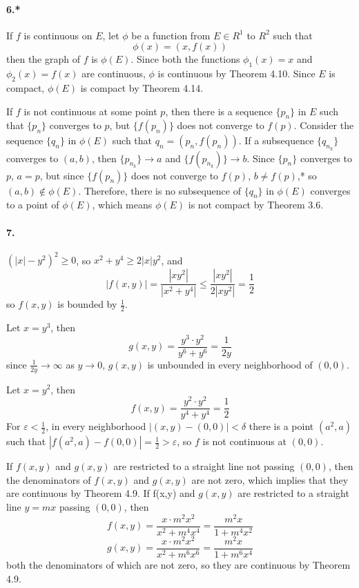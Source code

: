 \documentclass[a4paper]{article}
\begin{document}
\paragraph{6.*}
If $f$ is continuous on $E$, let $\phi$ be a function from $E\in R^1$ to $R^2$ such that 
\[
\phi(x)=(x,f(x))
\]
then the graph of $f$ is $\phi(E)$. Since both the functions  $\phi_1(x)=x$ and $\phi_2(x)=f(x)$ are continuous, $\phi$ is continuous by Theorem 4.10. Since $E$ is compact, $\phi(E)$ is compact by Theorem 4.14.
\smallskip

If $f$ is not continuous at some point $p$, then there is a sequence $\{p_n\}$ in $E$ such that $\{p_n\}$ converges to $p$, but $\{f(p_n)\}$ does not converge to $f(p)$. Consider the sequence $\{q_n\}$ in $\phi(E)$ such that $q_n=(p_n,f(p_n))$. If a subsequence $\{q_{n_k}\}$ converges to $(a,b)$, then $\{p_{n_k}\}\to a$ and $\{f(p_{n_k})\}\to b$. Since $\{p_n\}$ converges to $p$,\; $a=p$, but since $\{f(p_n)\}$ does not converge to $f(p)$,\; $b\neq f(p)$,* so $(a,b)\not\in \phi(E)$. Therefore, there is no subsequence of $\{q_n\}$ in $\phi(E)$ converges to a point of $\phi(E)$, which means $\phi(E)$ is not compact by Theorem 3.6. 

\paragraph{7.}
$(|x|-y^2)^2\geq0$, so $x^2+y^4\geq2|x|y^2$, and
\[
|f(x,y)|=\frac{|xy^2|}{|x^2+y^4|}\leq\frac{|xy^2|}{2|xy^2|}=\frac{1}{2}
\]
so $f(x,y)$ is bounded by $\frac{1}{2}$.
\smallskip

Let $x=y^3$, then
\[
g(x,y)=\frac{y^3\cdot y^2}{y^6+y^6}=\frac{1}{2y}
\]
since $\frac{1}{2y}\to\infty$ as $y\to0$,\; $g(x,y)$ is unbounded in every neighborhood of $(0,0)$.
\smallskip

Let $x=y^2$, then
\[
f(x,y)=\frac{y^2\cdot y^2}{y^4+y^4}=\frac{1}{2}
\]
For $\varepsilon<\frac{1}{2}$, in every neighborhood $|(x,y)-(0,0)|<\delta$ there is a point $(a^2,a)$ such that $|f(a^2,a)-f(0,0)|=\frac{1}{2}>\varepsilon$, so $f$ is not continuous at $(0,0)$.
\smallskip

If $f(x,y)$ and $g(x,y)$ are restricted to a straight line not passing $(0,0)$, then the denominators of $f(x,y)$ and $g(x,y)$ are not zero, which implies that they are continuous by Theorem 4.9. If f(x,y) and $g(x,y)$ are restricted to a straight line $y=mx$ passing $(0,0)$, then
\[
f(x,y)=\frac{x\cdot m^2x^2}{x^2+m^4x^4}=\frac{m^2x}{1+m^4x^2}
\]
\[
g(x,y)=\frac{x\cdot m^2x^2}{x^2+m^6x^6}=\frac{m^2x}{1+m^6x^4}
\]
both the denominators of which are not zero, so they are continuous by Theorem 4.9.
\end{document}
